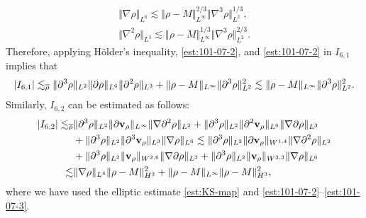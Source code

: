 \documentclass[11pt]{article}
\theoremstyle{plain}
\theoremstyle{definition}
\theoremstyle{remark}
\renewcommand{\vec}[1]{{\bf #1}}
\newcommand{\norm}[2]{\Vert #1 \Vert_{#2}}
\numberwithin{equation}{section}
\begin{document}
\begin{align}
    \label{est:101-07-2}
    \norm{\nabla\rho}{L^6} \lesssim \norm{\rho-M}{L^\infty}^{2/3} \norm{\nabla^3 \rho}{L^2}^{1/3}, \\
    \label{est:101-07-3}
    \norm{\nabla^2\rho}{L^3} \lesssim \norm{\rho-M}{L^\infty}^{1/3} \norm{\nabla^3 \rho}{L^2}^{2/3}. 
\end{align}
Therefore, applying H\"older's inequality, \eqref{est:101-07-2}, and \eqref{est:101-07-2} in $ I_{6,1} $ implies that
\begin{equation}\label{est:101-07-4}
    \vert I_{6,1} \vert \lesssim_{\overline\rho} \norm{\partial^3\rho}{L^2} \norm{\partial\rho}{L^6}\norm{\partial^2\rho}{L^3} + \norm{\rho-M}{L^\infty} \norm{\partial^3 \rho}{L^2}^2 \\
    \lesssim \norm{\rho-M}{L^\infty} \norm{\partial^3 \rho}{L^2}^2.
\end{equation} 
Similarly, $ I_{6,2} $ can be estimated as follows:
\begin{equation}
    \label{est:101-07-5}
    \begin{aligned}
        \vert I_{6,2} \vert \lesssim_{\overline\rho} & \norm{\partial^3 \rho}{L^2} \norm{\partial \vec v_\rho}{L^\infty} \norm{\nabla\partial^2 \rho}{L^2} + \norm{\partial^3 \rho}{L^2} \norm{\partial^2 \vec v_\rho}{L^6} \norm{\nabla\partial \rho}{L^3} \\
        & + \norm{\partial^3 \rho}{L^2} \norm{\partial^3 \vec v_\rho}{L^3} \norm{\nabla \rho}{L^6} \lesssim  \norm{\partial^3 \rho}{L^2} \norm{\partial \vec v_\rho}{W^{1,4}} \norm{\nabla\partial^2 \rho}{L^2} \\
        & + \norm{\partial^3 \rho}{L^2} \norm{\vec v_\rho}{W^{2,6}} \norm{\nabla\partial \rho}{L^3} 
         + \norm{\partial^3 \rho}{L^2} \norm{\vec v_\rho}{W^{3,3}} \norm{\nabla \rho}{L^6} \\
        \lesssim & \norm{\nabla \rho}{L^4} \norm{\rho-M}{H^3}^2  + \norm{\rho-M}{L^\infty} \norm{\rho - M}{H^3}^2,
    \end{aligned}
\end{equation}
where we have used the elliptic estimate \eqref{est:KS-map} and \eqref{est:101-07-2}--\eqref{est:101-07-3}.  
\end{document}
